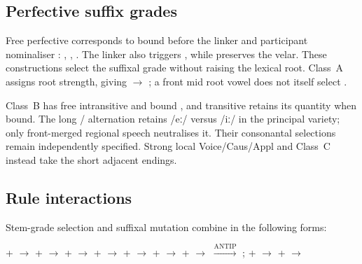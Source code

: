 \subsection{Perfective suffix grades}\label{sec:pf-dissim}

Free perfective  corresponds to bound  before
the linker  and participant nominaliser :
, , . The linker also triggers
, while  preserves the velar. These
constructions select the suffixal grade without raising the lexical root.
Class~A assigns root strength, giving  $\rightarrow$
; a front mid root vowel does not itself select .

Class~B has free intransitive  and bound , and
transitive  retains its quantity when bound. The long
/ alternation retains /eː/ versus /iː/ in the
principal variety; only front-merged regional speech neutralises it. Their consonantal selections remain independently
specified. Strong local
Voice/Caus/Appl and Class~C instead take the short adjacent endings.

\subsection{Rule interactions}\label{sec:morphophon-interactions}

Stem-grade selection and suffixal mutation combine in the following forms:

\pex
\a {} +  $\rightarrow$ 
\a {} +  $\rightarrow$ 
\a {} +  $\rightarrow$ 
\a {} +  $\rightarrow$ 
\a {} +  $\rightarrow$ 
\a {} +  $\rightarrow$ 
\a {} +  $\rightarrow$ 
\a {} $\xrightarrow{\mathrm{ANTIP}}$ ;
 +  $\rightarrow$ 
\a {} +  $\rightarrow$ 
\xe

